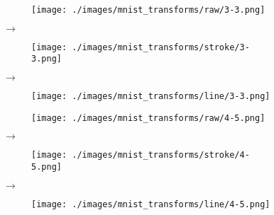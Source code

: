 \begin{figure}[H]
    \centering

    \begin{subfigure}{.15\columnwidth}
        \centering
        \texttt{[image: ./images/mnist\_transforms/raw/3-3.png]}
        \caption{}
        \label{fig:line_orig1}
    \end{subfigure}%
    $\rightarrow$
    \begin{subfigure}{.15\columnwidth}
        \centering
        \texttt{[image: ./images/mnist\_transforms/stroke/3-3.png]}
        \caption{}
        \label{fig:line_skel1}
    \end{subfigure}%
    $\rightarrow$
    \begin{subfigure}{.15\columnwidth}
        \centering
        \texttt{[image: ./images/mnist\_transforms/line/3-3.png]}
        \caption{}
        \label{fig:line_transform1}
    \end{subfigure}

    \par\medskip

    \begin{subfigure}{.15\columnwidth}
        \centering
        \texttt{[image: ./images/mnist\_transforms/raw/4-5.png]}
        \caption{}
        \label{fig:line_orig2}
    \end{subfigure}%
    $\rightarrow$
    \begin{subfigure}{.15\columnwidth}
        \centering
        \texttt{[image: ./images/mnist\_transforms/stroke/4-5.png]}
        \caption{}
        \label{fig:line_skel2}
    \end{subfigure}%
    $\rightarrow$
    \begin{subfigure}{.15\columnwidth}
        \centering
        \texttt{[image: ./images/mnist\_transforms/line/4-5.png]}
        \caption{}
        \label{fig:line_transform2}
    \end{subfigure}

    \par\medskip


\end{figure}

